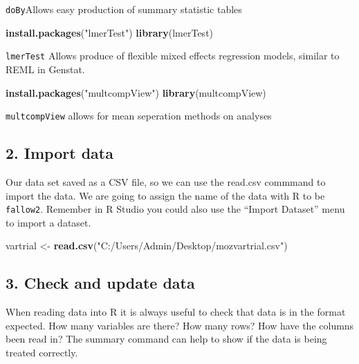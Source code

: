 \documentclass[]{book}
\newenvironment{Shaded}{\begin{snugshade}}{\end{snugshade}}
\newcommand{\KeywordTok}[1]{\textcolor[rgb]{0.13,0.29,0.53}{\textbf{#1}}}
\newcommand{\StringTok}[1]{\textcolor[rgb]{0.31,0.60,0.02}{#1}}
\newcommand{\NormalTok}[1]{#1}
\theoremstyle{definition}
\theoremstyle{definition}
\theoremstyle{definition}
\theoremstyle{remark}
\begin{document}
\texttt{doBy}Allows easy production of summary statistic tables

\begin{Shaded}
\begin{Highlighting}[]
\KeywordTok{install.packages}\NormalTok{(}\StringTok{"lmerTest"}\NormalTok{)}
\KeywordTok{library}\NormalTok{(lmerTest)}
\end{Highlighting}
\end{Shaded}

\texttt{lmerTest} Allows produce of flexible mixed effects regression
models, similar to REML in Genstat.

\begin{Shaded}
\begin{Highlighting}[]
\KeywordTok{install.packages}\NormalTok{(}\StringTok{"multcompView"}\NormalTok{)}
\KeywordTok{library}\NormalTok{(multcompView)}
\end{Highlighting}
\end{Shaded}

\texttt{multcompView} allows for mean seperation methods on analyses

\subsection{2. Import data}\label{import-data-4}

Our data set saved as a CSV file, so we can use the read.csv commmand to
import the data. We are going to assign the name of the data with R to
be \texttt{fallow2}. Remember in R Studio you could also use the
``Import Dataset'' menu to import a dataset.

\begin{Shaded}
\begin{Highlighting}[]
\NormalTok{vartrial <-}\StringTok{ }\KeywordTok{read.csv}\NormalTok{(}\StringTok{"C:/Users/Admin/Desktop/mozvartrial.csv"}\NormalTok{)}
\end{Highlighting}
\end{Shaded}

\subsection{3. Check and update data}\label{check-and-update-data-4}

When reading data into R it is always useful to check that data is in
the format expected. How many variables are there? How many rows? How
have the columns been read in? The summary command can help to show if
the data is being treated correctly.
\end{document}
